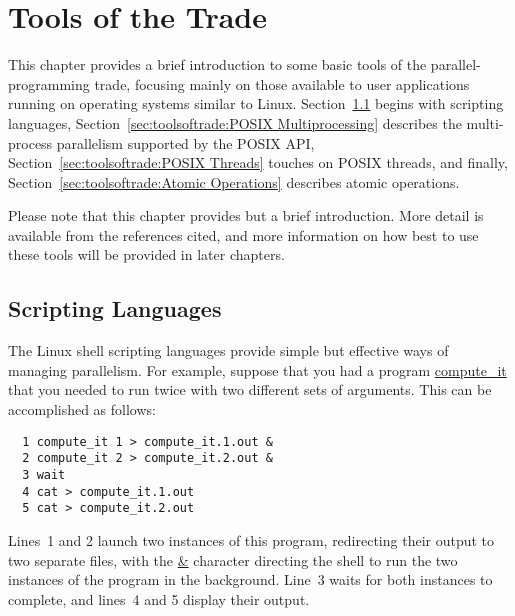 
\chapter{Tools of the Trade}
\label{chp:Tools of the Trade}


This chapter provides a brief introduction to some basic tools of the
parallel-programming trade, focusing mainly on those available to
user applications running on operating systems similar to Linux.
Section~\ref{sec:toolsoftrade:Scripting Languages} begins with
scripting languages,
Section~\ref{sec:toolsoftrade:POSIX Multiprocessing}
describes the multi-process parallelism supported by the POSIX API,
Section~\ref{sec:toolsoftrade:POSIX Threads} touches on POSIX threads,
and finally,
Section~\ref{sec:toolsoftrade:Atomic Operations}
describes atomic operations.

Please note that this chapter provides but a brief introduction.
More detail is available from the references cited, and more information
on how best to use these tools will be provided in later chapters.

\section{Scripting Languages}
\label{sec:toolsoftrade:Scripting Languages}

The Linux shell scripting languages provide simple but effective ways
of managing parallelism.
For example, suppose that you had a program \url{compute_it}
that you needed to run twice with two different sets of arguments.
This can be accomplished as follows:

\vspace{5pt}
\begin{minipage}[t]{\columnwidth}
\begin{verbatim}
  1 compute_it 1 > compute_it.1.out &
  2 compute_it 2 > compute_it.2.out &
  3 wait
  4 cat > compute_it.1.out
  5 cat > compute_it.2.out
\end{verbatim}
\end{minipage}
\vspace{5pt}

Lines~1 and 2 launch two instances of this program, redirecting their
output to two separate files, with the \url{&} character directing the
shell to run the two instances of the program in the background.
Line~3 waits for both instances to complete, and lines~4 and 5
display their output.

